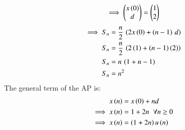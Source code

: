 \documentclass[journal,12pt,twocolumn]{IEEEtran}
\theoremstyle{remark}
\begin{document}
\begin{align}
 \implies
 \begin{pmatrix}
    x\left(0\right)\\
    d
 \end{pmatrix}
 =
 \begin{pmatrix}
    1\\2
 \end{pmatrix}
\end{align}
\begin{align}
\implies S_n&= \frac{n}{2}\,\left(2x\left(0\right)+\left(n-1\right)\,d\right)\label{eq10.5.3.9.4}\\
S_n&=\frac{n}{2}\,\left(2\left(1\right)+\left(n-1\right)\left(2\right)\right)  \\
S_n&=n\,\left(1+n-1\right)  \\
S_n&=n^2\label{eq10.5.3.9.5}
\end{align}
The general term of the AP is:
\begin{align}
    x\left(n\right)&=x\left(0\right)+nd\\
    \implies x\left(n\right)&= 1+2n \;\; \forall n\geq0\\
    \implies x\left(n\right)&= \left(1+2n\right)u\left(n\right)
\end{align}
\end{document}
